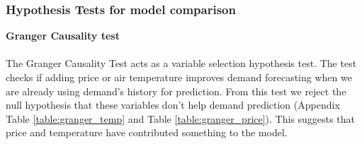 \documentclass[11pt]{article}
\begin{document}
\begin{table}[H]
\centering
\caption{Model Evaluation for the time series models by Rolling Window one step ahead}
\label{table:model_validation_time}
\end{table}



\subsubsection{Hypothesis Tests for model comparison}

\noindent \textbf{Granger Causality test}
\\
\\
The Granger Causality Test acts as a variable selection hypothesis test. The test checks if adding price or air temperature improves demand forecasting when we are already using demand's history for prediction. From this test we reject the null hypothesis that these variables don't help demand prediction (Appendix Table \ref{table:granger_temp} and Table \ref{table:granger_price}). This suggests that price and temperature have contributed something to the model.
\\
\\
\end{document}
